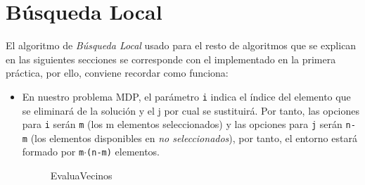 \newpage

\section{Búsqueda Local}
\hspace{1.5cm}El algoritmo de \textit{Búsqueda Local} usado para el resto de algoritmos que se explican en las siguientes secciones se corresponde con el implementado en la primera práctica, por ello, conviene recordar como funciona: 

\begin{itemize}
	
	

\item En nuestro problema MDP, el parámetro \texttt{i} indica el índice del elemento que se eliminará de la solución y el j por cual se sustituirá. Por tanto, las opciones para \texttt{i} serán \texttt{m} (los m elementos seleccionados) y las opciones para \texttt{j} serán \texttt{n-m} (los elementos disponibles en \textit{no seleccionados}), por tanto, el entorno estará formado por \texttt{m$\cdot$(n-m)} elementos.


	
	\begin{figure}[H]
		\centering
		\begin{minipage}{.75\linewidth}
			
			\begin{algorithm}[H] 
				\caption{EvaluaVecinos }
				\SetAlgoLined
				
				
				
\end{algorithm}
\end{minipage}
\end{figure}
\end{itemize}
